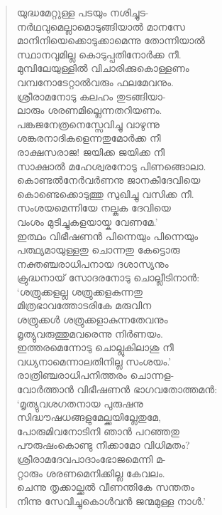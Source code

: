 \begin{verse}
യുദ്ധമേറ്റുള്ള പടയും നശിച്ചുട-\\
നര്‍ഥവുമെല്ലാമൊടുങ്ങിയാല്‍ മാനസേ\\
മാനിനിയെക്കൊടുക്കാമെന്നു തോന്നിയാല്‍\\
സ്ഥാനവുമില്ല കൊടുപ്പതിനോര്‍ക്ക നീ.\\
മുമ്പിലേയുള്ളില്‍ വിചാരിക്കുകൊള്ളണം\\
വമ്പനോടേറ്റാല്‍വരും ഫലമേവനും.\\
ശ്രീരാമനോടു കലഹം തുടങ്ങിയാ-\\
ലാരും ശരണമില്ലെന്നതറിയണം.\\
പങ്കജനേത്രനെസ്സേവിച്ചു വാഴുന്നു\\
ശങ്കരനാദികളെന്നതുമോര്‍ക്ക നീ\\
രാക്ഷസരാജ! ജയിക്ക ജയിക്ക നീ\\
സാക്ഷാല്‍ മഹേശ്വരനോടു പിണങ്ങൊലാ.\\
കൊണ്ടല്‍നേര്‍വര്‍ണനു ജാനകീദേവിയെ\\
കൊണ്ടെക്കൊടുത്തു സുഖിച്ചു വസിക്ക നീ.\\
സംശയമെന്നിയേ നല്കുക ദേവിയെ\\
വംശം മുടിച്ചുകളയായ്ക വേണമേ.’\\
ഇത്ഥം വിഭീഷണന്‍ പിന്നെയും പിന്നെയും\\
പത്ഥ്യമായുള്ളതു ചൊന്നതു കേട്ടൊരു\\
നക്തഞ്ചരാധിപനായ ദശാസ്യനും\\
ക്രുദ്ധനായ് സോദരനോടു ചൊല്ലീടിനാന്‍:\\
‘ശത്രുക്കളല്ല ശത്രുക്കളകുന്നതു\\
മിത്രഭാവത്തോടരികേ മരുവിന\\
ശത്രുക്കള്‍ ശത്രുക്കളാകുന്നതേവനും\\
മൃത്യുവരുത്തുമവരെന്നു നിര്‍ണയം.\\
ഇത്തരമെന്നോടു ചൊല്ലുകിലാശു നീ\\
വധ്യനാമെന്നാലതിനില്ല സംശയം.’\\
രാത്രിഞ്ചരാധിപനിത്തരം ചൊന്നള-\\
വോര്‍ത്താന്‍ വിഭീഷണന്‍ ഭാഗവതോത്തമന്‍:\\
‘മൃത്യുവശഗതനായ പുരുഷനു\\
സിദ്ധൗഷധങ്ങളുമേല്ക്കയില്ലേതുമേ,\\
പോരുമിവനോടിനി ഞാന്‍ പറഞ്ഞതു\\
പൗരുഷംകൊണ്ടു നീക്കാമോ വിധിമതം?\\
ശ്രീരാമദേവപാദാംഭോജമെന്നി മ-\\
റ്റാരും ശരണമെനിക്കില്ല കേവലം.\\
ചെന്നു തൃക്കാല്ക്കല്‍ വീണന്തികേ സന്തതം\\
നിന്നു സേവിച്ചുകൊള്‍വന്‍ ജന്മമുള്ള നാള്‍.’\\

\end{verse}
